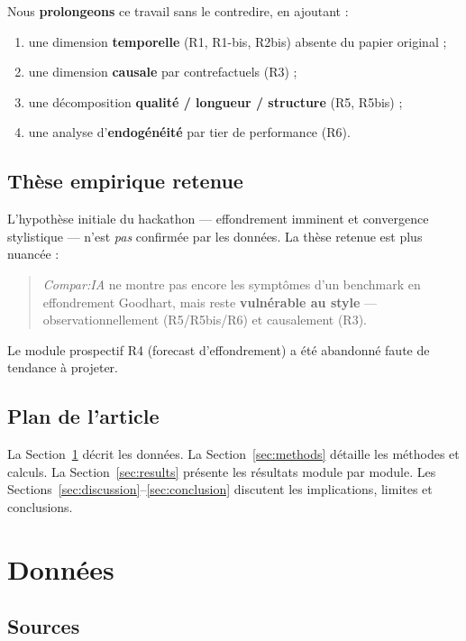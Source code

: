 \documentclass[11pt,a4paper]{article}
\begin{document}
Nous \textbf{prolongeons} ce travail sans le contredire, en ajoutant :
\begin{enumerate}[noitemsep]
  \item une dimension \textbf{temporelle} (R1, R1-bis, R2bis) absente du papier original ;
  \item une dimension \textbf{causale} par contrefactuels (R3) ;
  \item une décomposition \textbf{qualité / longueur / structure} (R5, R5bis) ;
  \item une analyse d'\textbf{endogénéité} par tier de performance (R6).
\end{enumerate}

\subsection{Thèse empirique retenue}

L'hypothèse initiale du hackathon --- effondrement imminent et convergence
stylistique --- n'est \emph{pas} confirmée par les données. La thèse retenue est
plus nuancée :

\begin{quote}
\emph{Compar:IA} ne montre pas encore les symptômes d'un benchmark en
effondrement Goodhart, mais reste \textbf{vulnérable au style} --- observationnellement
(R5/R5bis/R6) et causalement (R3).
\end{quote}

Le module prospectif R4 (forecast d'effondrement) a été abandonné faute de tendance
à projeter.

\subsection{Plan de l'article}

La Section~\ref{sec:data} décrit les données. La Section~\ref{sec:methods} détaille
les méthodes et calculs. La Section~\ref{sec:results} présente les résultats module
par module. Les Sections~\ref{sec:discussion}--\ref{sec:conclusion} discutent les
implications, limites et conclusions.

\section{Données}
\label{sec:data}

\subsection{Sources}
\end{document}
